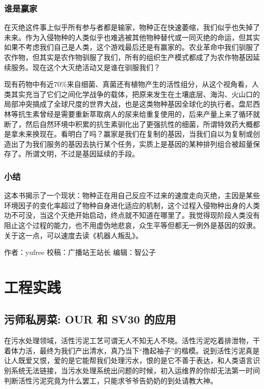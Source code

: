 \documentclass[]{book}
\begin{document}
\subsection{谁是赢家}

在灭绝这件事上似乎所有参与者都是输家，物种正在快速萎缩，我们似乎也失掉了未来。作为入侵物种的人类似乎也难逃被其他物种替代或一同灭绝的命运，但其实如果不考虑我们自己是人类，这个游戏最后还是有赢家的。农业革命中我们驯服了农作物，但其实是农作物驯服了我们，所有的组织生产模式都成了为农作物基因延续服务。现在这个大灭绝活动又是谁在驯服我们？

现有药物中有近70\%来自细菌、真菌还有植物产生的活性组分，从这个视角看，人类其实充当了它们之间化学战争的载体，把原来发生在土壤底层、海沟、火山口的局部冲突搞成了全球尺度的世界大战，也是这类物种基因全球化的执行者。盘尼西林等抗生素曾经是需要重新萃取病人的尿来给重复使用的，后来产量上来了循环就断了，然后自然环境中积累的抗生素驯化出了更强抗性的细菌，所谓特效药大概都是拿未来换现在。看明白了吗？赢家是我们在复制的基因，当我们自以为复制或创造出了为我们服务的基因去执行某个任务，实质上是基因的某种排列组合被超量保存了。所谓文明，不过是基因延续的手段。

\subsection{小结}\label{-2}

这本书揭示了一个现状：物种正在用自己反应不过来的速度走向灭绝，主因是某些环境因子的变化率超过了物种自身进化适应的机制，这个过程入侵物种出身的人类功不可没，当这个灭绝开始启动，终点就不知道在哪里了。我觉得现阶段人类没有阻止这个过程的能力，也不用虚伪地悲哀，众生平等但都无一例外是基因的奴隶。关于这一点，可以速度去读《机器人叛乱》。

作者：yufree 校稿：广播站王站长 编辑：智公子

\chapter{工程实践}

\section{污师私房菜: OUR 和 SV30 的应用}\label{-our--sv30-}

在污水处理领域，活性污泥工艺可谓无人不知无人不晓。活性污泥吃着排泄物，干着体力活，最终为我们产出清水，真乃当下``撸起袖子''的楷模。说到活性污泥真是让人既爱又恨，爱的是它能帮我们处理污水，恨的是它不善于表达，和人类语言识别系统无法链接，当污水处理系统出问题的时候，初入运维界的你却无法第一时间判断活性污泥究竟为什么罢工，只能求爷爷告奶奶的到处请教大神。
\end{document}
